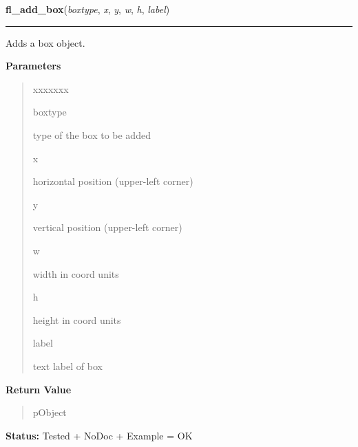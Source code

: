     \label{xformslib:library:fl_add_box}

    \vspace{0.5ex}

\hspace{.8\funcindent}\begin{boxedminipage}{\funcwidth}

    \raggedright \textbf{fl\_add\_box}(\textit{boxtype}, \textit{x}, \textit{y}, \textit{w}, \textit{h}, \textit{label})

    \vspace{-1.5ex}

    \rule{\textwidth}{0.5\fboxrule}
\setlength{\parskip}{2ex}
    Adds a box object.

\setlength{\parskip}{1ex}
      \textbf{Parameters}
      \vspace{-1ex}

      \begin{quote}
        \begin{Ventry}{xxxxxxx}

          \item[boxtype]

          type of the box to be added

          \item[x]

          horizontal position (upper-left corner)

          \item[y]

          vertical position (upper-left corner)

          \item[w]

          width in coord units

          \item[h]

          height in coord units

          \item[label]

          text label of box

        \end{Ventry}

      \end{quote}

      \textbf{Return Value}
    \vspace{-1ex}

      \begin{quote}
      pObject

      \end{quote}

\textbf{Status:} Tested + NoDoc + Example = OK



    \end{boxedminipage}

